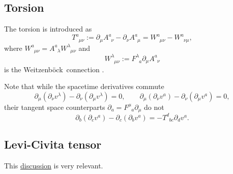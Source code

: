 \documentclass[
10pt, %
a4paper, %
oneside, %
headinclude,footinclude, %
BCOR5mm, %
]{scrartcl}
\newcommand{\pd}[1]{\partial_{#1}}
\newcommand{\itetr}[2]{F^{#1}_{\phantom{#1}#2}}
\newcommand{\tetr}[2]{A^{#1}_{\phantom{#1}#2}}
\newcommand{\rtetr}[2]{h^{#1}_{\mathsmaller{(r)} #2}}
\newcommand{\spin}[2]{\omega^{#1}_{\phantom{#1}#2}}
\newcommand{\D}[1]{\partial_{#1}} %
\newcommand{\Tors}[2]{T^{#1}_{\phantom{a}#2}}
\newcommand{\w}[2]{W^{#1}_{\phantom{#1}#2}}
\newcommand{\We}{Weitzenb\"ock}
\begin{document}
\subsection{Torsion}

The torsion is introduced as
\begin{equation}\label{eqn.def.tors}
\Tors{a}{\mu\nu}:=\D{\mu}\tetr{a}{\nu} - \D{\nu}\tetr{a}{\mu} = 
\w{a}{\mu\nu} - \w{a}{\nu\mu},
\end{equation}
where $ \w{a}{\mu\nu} = \tetr{a}{\lambda}\w{\lambda}{\mu\nu}$ and 
\begin{equation}
\w{\lambda}{\mu\nu} := 
\itetr{\lambda}{a}\pd{\mu} \tetr{a}{\nu}
\end{equation}
is the \We\ connection \cite{AldrovandiPereiraBook,KleinertMultivalued}.


Note that while the spacetime derivatives commute
\begin{equation}\label{eqn.commut.D}
\D{\mu}(\D{\nu} v^\lambda) - \D{\nu}(\D{\mu} v^\lambda) = 0, 
\qquad 
\D{\mu}(\D{\nu} v^a) - \D{\nu}(\D{\mu} v^a) = 0,
\end{equation}
their tangent space counterparts $\D{a} = \itetr{\mu}{a}\D{\mu}$ do not
\begin{equation}
\D{b}(\D{c} v^a) - \D{c}(\D{b} v^a) = 
-\Tors{d}{b c}\D{d}v^a .
\end{equation}

%


\subsection{Levi-Civita tensor}

This \href{https://physics.stackexchange.com/questions/429434/lorentz-covariant-derivative-of-the-vielbein-determinant}{discussion} is very relevant.
\end{document}
